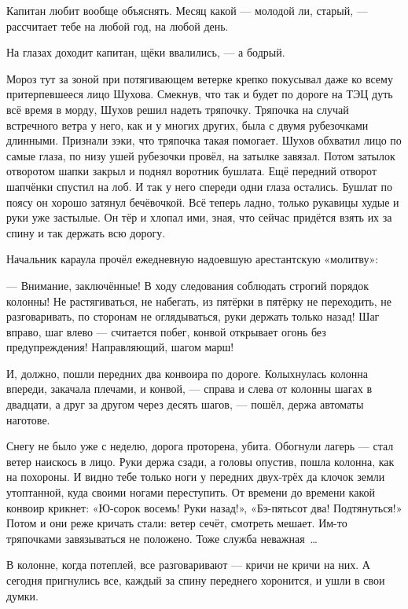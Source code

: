 Капитан любит вообще объяснять. Месяц какой --- молодой ли, старый, --- рассчитает тебе на любой 
год, на любой день.

На глазах доходит капитан, щёки ввалились, --- а бодрый.

Мороз тут за зоной при потягивающем ветерке крепко покусывал даже ко всему притерпевшееся 
лицо Шухова. Смекнув, что так и будет по дороге на ТЭЦ дуть всё время в морду, Шухов решил 
надеть тряпочку. Тряпочка на случай встречного ветра у него, как и у многих других, была с 
двумя рубезочками длинными. Признали зэки, что тряпочка такая помогает. Шухов обхватил лицо 
по самые глаза, по низу ушей рубезочки провёл, на затылке завязал. Потом затылок отворотом 
шапки закрыл и поднял воротник бушлата. Ещё передний отворот шапчёнки спустил на лоб. И так у 
него спереди одни глаза остались. Бушлат по поясу он хорошо затянул бечёвочкой. Всё теперь 
ладно, только рукавицы худые и руки уже застылые. Он тёр и хлопал ими, зная, что сейчас 
придётся взять их за спину и так держать всю дорогу.

Начальник караула прочёл ежедневную надоевшую арестантскую «молитву»:

--- Внимание, заключённые! В ходу следования соблюдать строгий порядок колонны! Не 
растягиваться, не набегать, из пятёрки в пятёрку не переходить, не разговаривать, по 
сторонам не оглядываться, руки держать только назад! Шаг вправо, шаг влево --- считается 
побег, конвой открывает огонь без предупреждения! Направляющий, шагом марш!

И, должно, пошли передних два конвоира по дороге. Колыхнулась колонна впереди, закачала 
плечами, и конвой, --- справа и слева от колонны шагах в двадцати, а друг за другом через десять 
шагов, --- пошёл, держа автоматы наготове.

Снегу не было уже с неделю, дорога проторена, убита. Обогнули лагерь --- стал ветер наискось в 
лицо. Руки держа сзади, а головы опустив, пошла колонна, как на похороны. И видно тебе только 
ноги у передних двух-трёх да клочок земли утоптанной, куда своими ногами переступить. От 
времени до времени какой конвоир крикнет: «Ю-сорок восемь! Руки назад!», «Бэ-пятьсот два! 
Подтянуться!» Потом и они реже кричать стали: ветер сечёт, смотреть мешает. Им-то тряпочками 
завязываться не положено. Тоже служба неважная~\dots{}

В колонне, когда потеплей, все разговаривают --- кричи не кричи на них. А сегодня пригнулись 
все, каждый за спину переднего хоронится, и ушли в свои думки.

